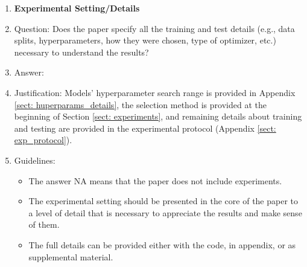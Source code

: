 \documentclass{article}
\theoremstyle{plain}
\theoremstyle{definition}
\theoremstyle{remark}
\begin{document}
\begin{enumerate}
\item {\bf Experimental Setting/Details}
    \item[] Question: Does the paper specify all the training and test details (e.g., data splits, hyperparameters, how they were chosen, type of optimizer, etc.) necessary to understand the results?
    \item[] Answer: \answerYes{}{} %
    \item[] Justification: Models' hyperparameter search range is provided in Appendix \ref{sect: huperparams_details}, the selection method is provided at the beginning of Section \ref{sect: experiments}, and remaining details about training and testing are provided in the experimental protocol (Appendix \ref{sect: exp_protocol}).

    \item[] Guidelines:
    \begin{itemize}
        \item The answer NA means that the paper does not include experiments.
        \item The experimental setting should be presented in the core of the paper to a level of detail that is necessary to appreciate the results and make sense of them.
        \item The full details can be provided either with the code, in appendix, or as supplemental material.
    \end{itemize}


\end{enumerate}
\end{document}
